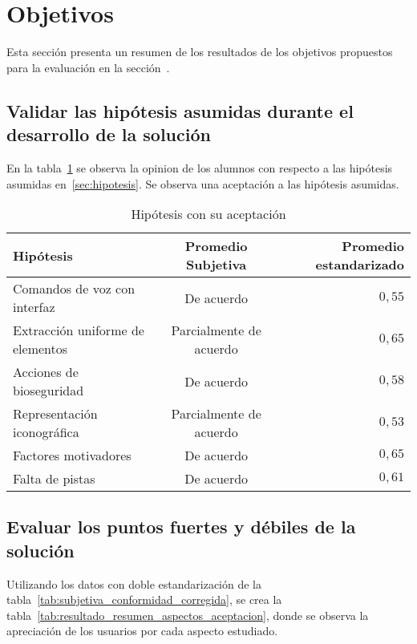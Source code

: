 \section{Objetivos}
\label{sec:resultados_objetivos}

Esta sección presenta un resumen de los resultados de los objetivos propuestos
para la evaluación en la sección~\label{sec:evaluacion_objetivos}. 

\subsection{Validar las hipótesis asumidas durante el desarrollo de la solución}

En la tabla~\ref{tab:resultado_resumen_hipotesis} se observa la opinion de los
alumnos con respecto a las hipótesis asumidas en~\ref{sec:hipotesis}. Se observa
una aceptación a las hipótesis asumidas.

\begin{table}[!hbt]
\centering
\begin{tabular}{lcr}
\toprule
Hipótesis                        & Promedio Subjetiva      & Promedio estandarizado \\
\midrule
Comandos de voz con interfaz     & De acuerdo              & $0,55$ \\
Extracción uniforme de elementos & Parcialmente de acuerdo & $0,65$ \\
Acciones de bioseguridad         & De acuerdo              & $0,58$ \\
Representación iconográfica      & Parcialmente de acuerdo & $0,53$ \\
Factores motivadores             & De acuerdo              & $0,65$ \\
Falta de pistas                  & De acuerdo              & $0,61$ \\
\bottomrule
\end{tabular}
\caption{Hipótesis con su aceptación}\label{tab:resultado_resumen_hipotesis}
\end{table}


\subsection{Evaluar los puntos fuertes y débiles de la solución}

Utilizando los datos con doble estandarización de la
tabla~\ref{tab:subjetiva_conformidad_corregida}, se crea la
tabla~\ref{tab:resultado_resumen_aspectos_aceptacion}, donde se observa la
apreciación de los usuarios por cada aspecto estudiado.

